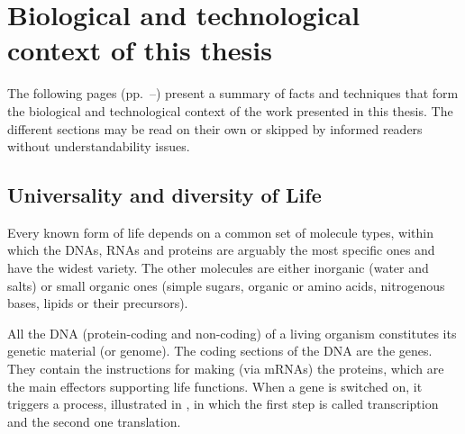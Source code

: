 \chapter{Biological and technological context of this thesis}%
\label{ch:background}

\setlength{\epigraphwidth}{0.9\textwidth}
\setlength{\epigraphrule}{0pt}

The following pages (pp.~\pageref{sec:bio}--\pageref{sec:bgConcl})
present a summary of facts and techniques
that form the biological and technological context
of the work presented in this thesis.
The different sections may be read on their own
or skipped by informed readers without understandability issues.\mybr\

\vspace{-1mm}
\section{Universality and diversity of Life}\label{sec:bio}
\vspace{-1mm}

Every known form of life depends on a common set of molecule types,
within which the \glspl{DNA}, \glspl{RNA} and proteins
are arguably the most specific ones and have the widest variety.
The other molecules are either inorganic (water and salts)
or small organic ones (simple sugars, organic or amino acids,
nitrogenous bases, lipids or their precursors).~\mybr\

All the \gls{DNA} (protein-coding and non-coding) of a living organism
constitutes its genetic material (or genome).
The coding sections of the \gls{DNA} are the genes.
They contain the instructions for making (via \glspl{mRNA}) the proteins,
which are the main effectors supporting life functions.
When a gene is switched on,
it triggers a process,
illustrated in ,
in which the first step is called transcription
and the second one translation.~\mybr\

